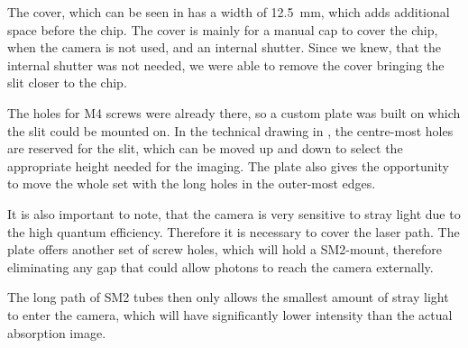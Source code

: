 The cover, which can be seen in  has a width of \SI{12.5}{\milli\meter}, which adds additional space before the chip. The cover is mainly for a manual cap to cover the chip, when the camera is not used, and an internal shutter. Since we knew, that the internal shutter was not needed, we were able to remove the cover bringing the slit closer to the chip.

The holes for M4 screws were already there, so a custom plate was built on which the slit could be mounted on.
In the technical drawing in , the centre-most holes are reserved for the slit, which can be moved up and down to select the appropriate height needed for the imaging.
The plate also gives the opportunity to move the whole set with the long holes in the outer-most edges.

It is also important to note, that the camera is very sensitive to stray light due to the high quantum efficiency. Therefore it is necessary to cover the laser path. The plate offers another set of screw holes, which will hold a SM2-mount, therefore eliminating any gap that could allow photons to reach the camera externally.

The long path of SM2 tubes then only allows the smallest amount of stray light to enter the camera, which will have significantly lower intensity than the actual absorption image.